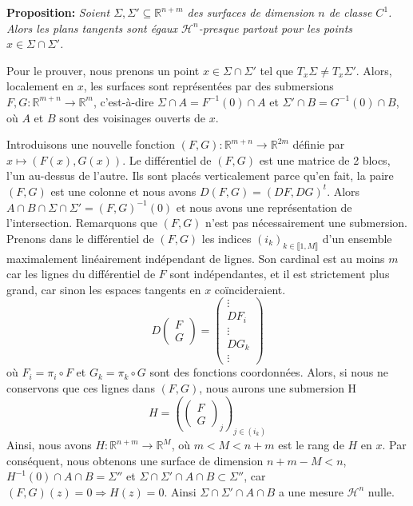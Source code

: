 \documentclass{article}
\begin{document}
\vspace{2ex}
\textbf{Proposition:} \textit{Soient $\Sigma, \Sigma' \subseteq \mathbb{R}^{n+m}$ des surfaces de dimension $n$ de classe $C^1$. Alors les plans tangents sont égaux $\mathcal{H}^n$-presque partout pour les points $x \in \Sigma \cap \Sigma'$.}

\vspace{1ex}
Pour le prouver, nous prenons un point $x\in\Sigma\cap\Sigma'$ tel que $T_x\Sigma\neq T_x \Sigma'$. Alors, localement en $x$, les surfaces sont représentées par des submersions $F,G:\mathbb R^{m+n}\rightarrow\mathbb R^m$, c'est-à-dire $\Sigma\cap A=F^{-1}(0)\cap A$ et $\Sigma'\cap B=G^{-1}(0)\cap B$, où $A$ et $B$ sont des voisinages ouverts de $x$.

\vspace{1ex}
Introduisons une nouvelle fonction $(F, G):\mathbb R^{m+n}\rightarrow\mathbb R^{2m}$ définie par $x\mapsto (F(x),G(x))$. Le différentiel de $(F,G)$ est une matrice de 2 blocs, l'un au-dessus de l'autre. Ils sont placés verticalement parce qu'en fait, la paire $(F,G)$ est une colonne et nous avons $D(F,G)=(DF,DG)^t$. Alors $A\cap B\cap\Sigma\cap\Sigma'=(F,G)^{-1}(0)$ et nous avons une représentation de l'intersection. Remarquons que $(F, G)$ n'est pas nécessairement une submersion. Prenons dans le différentiel de $(F,G)$ les indices $(i_k)_{k\in\llbracket1,M\rrbracket}$ d'un ensemble maximalement linéairement indépendant de lignes. Son cardinal est au moins $m$ car les lignes du différentiel de $F$ sont indépendantes, et il est strictement plus grand, car sinon les espaces tangents en $x$ coïncideraient.
\[D\left(\begin{array}{cc} F\\ G\end{array}\right) =
    \left(\begin{array}{cc} \vdots \\DF_i\\ \vdots\\ DG_k\\ \vdots\end{array}\right)\]
où $F_i=\pi_i\circ F$ et $G_k=\pi_k\circ G$ sont des fonctions coordonnées. Alors, si nous ne conservons que ces lignes dans $(F,G)$, nous aurons une submersion H
\[H=\left(\left(\begin{array}{cc} F\\ G\end{array}\right)_j\right)_{j\in(i_k)}\]
Ainsi, nous avons $H:\mathbb R^{n+m}\rightarrow\mathbb R^{M}$, où $m<M<n+m$ est le rang de $H$ en $x$. Par conséquent, nous obtenons une surface de dimension $n+m-M<n$, $H^{-1}(0)\cap A\cap B=\Sigma''$ et $\Sigma\cap\Sigma'\cap A\cap B\subset\Sigma''$, car $(F,G)(z)=0\Rightarrow H(z)=0$. Ainsi $\Sigma\cap\Sigma'\cap A\cap B$ a une mesure $\mathcal H^n$ nulle.
\end{document}
